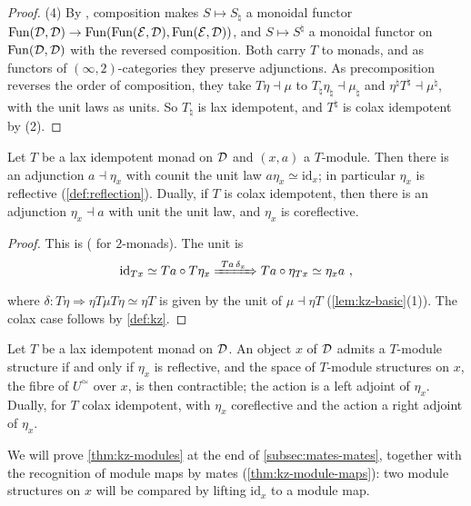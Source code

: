 \begin{proof}
(4) By \cite[\S 4.7.1]{ha}, composition makes
$S \mapsto S_{\natural}$
a monoidal functor
$\operatorname{Fun}(\mathcal{D},\mathcal{D}) \to \operatorname{Fun}(\operatorname{Fun}(\mathcal{E},\mathcal{D}),\operatorname{Fun}(\mathcal{E},\mathcal{D}))$,
and
$S \mapsto S^{\natural}$
a monoidal functor on $\operatorname{Fun}(\mathcal{D},\mathcal{D})$ with the reversed composition.
Both carry $T$ to monads, and as functors of $(\infty,2)$-categories they
preserve adjunctions. As precomposition reverses the order of composition,
they take
$T\eta \dashv \mu$
to
$T_{\natural}\eta_{\natural} \dashv \mu_{\natural}$
and
$\eta^{\natural}T^{\natural} \dashv \mu^{\natural}$,
with the unit laws as units. So $T_{\natural}$ is lax idempotent, and
$T^{\natural}$ is colax idempotent by (2).
\end{proof}

\begin{prop}
\label{prop:kz-action}
%
Let $T$ be a lax idempotent monad on $\mathcal{D}$ and $(x,a)$ a $T$-module. Then there
is an adjunction
$a \dashv \eta_{x}$
with counit the unit law
$a\eta_{x} \simeq \mathrm{id}_{x}$;
in particular $\eta_{x}$ is reflective (\cref{def:reflection}). Dually, if $T$
is colax idempotent, then there is an adjunction
$\eta_{x} \dashv a$
with unit the unit law, and $\eta_{x}$ is coreflective.
\end{prop}

\begin{proof}
%
This is \cite[Lemma~10.4]{marmolejo1997doctrines}
(\cite[Thm.~6.2]{kellylack1997propertylike} for $2$-monads).
 The unit is
\begin{equation*}
\mathrm{id}_{Tx} \simeq Ta \circ T\eta_{x} \xRightarrow{\ Ta\,\delta_{x}\ } Ta
\circ \eta_{Tx} \simeq \eta_{x}a \ ,
\end{equation*}
where
$\delta\colon T\eta \Rightarrow \eta T\mu T\eta \simeq \eta T$
is given by the unit of
$\mu \dashv \eta T$
(\cref{lem:kz-basic}(1)). The colax case follows by \cref{def:kz}.
\end{proof}

\begin{thm}
\label{thm:kz-modules}
%
Let $T$ be a lax idempotent monad on $\mathcal{D}$. An object $x$ of $\mathcal{D}$ admits a
$T$-module structure if and only if $\eta_{x}$ is reflective, and the space of
$T$-module structures on $x$, the fibre of $U^{\simeq}$ over $x$, is then
contractible; the action is a left adjoint of $\eta_{x}$. Dually, for $T$ colax
idempotent, with $\eta_{x}$ coreflective and the action a right adjoint of
$\eta_{x}$.
\end{thm}

%
We will prove \cref{thm:kz-modules} at the end of \cref{subsec:mates-mates},
together with the recognition of module maps by mates
(\cref{thm:kz-module-maps}): two module structures on $x$ will be compared by
lifting $\mathrm{id}_{x}$ to a module map.
